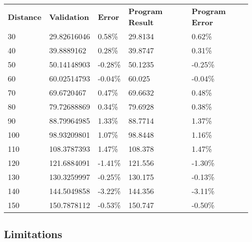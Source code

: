 \documentclass[conference]{IEEEtran}
\begin{document}
\begin{table}[]
\begin{tabular}{lllll}
\textbf{Distance} & \textbf{Validation} & \textbf{Error} & \textbf{Program Result} & \textbf{Program Error} \\
30                & 29.82616046         & 0.58\%         & 29.8134                 & 0.62\%                 \\
40                & 39.8889162          & 0.28\%         & 39.8747                 & 0.31\%                 \\
50                & 50.14148903         & -0.28\%        & 50.1235                 & -0.25\%                \\
60                & 60.02514793         & -0.04\%        & 60.025                  & -0.04\%                \\
70                & 69.6720467          & 0.47\%         & 69.6632                 & 0.48\%                 \\
80                & 79.72688869         & 0.34\%         & 79.6928                 & 0.38\%                 \\
90                & 88.79964985         & 1.33\%         & 88.7714                 & 1.37\%                 \\
100               & 98.93209801         & 1.07\%         & 98.8448                 & 1.16\%                 \\
110               & 108.3787393         & 1.47\%         & 108.378                 & 1.47\%                 \\
120               & 121.6884091         & -1.41\%        & 121.556                 & -1.30\%                \\
130               & 130.3259997         & -0.25\%        & 130.175                 & -0.13\%                \\
140               & 144.5049858         & -3.22\%        & 144.356                 & -3.11\%                \\
150               & 150.7878112         & -0.53\%        & 150.747                 & -0.50\%               
\end{tabular}
\end{table}

\subsection{Limitations}
\end{document}
